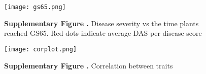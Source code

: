 \documentclass{frontiers_suppmat} %
\begin{document}
\begin{figure}[h!]
\begin{center}
\texttt{[image: gs65.png]}
\end{center}
\textbf{\label{fig:03} Supplementary Figure .}{ Disease severity vs the time plants reached GS65. Red dots indicate average DAS per disease score}
\end{figure}


\begin{figure}[h!]
\begin{center}
\texttt{[image: corplot.png]}
\end{center}
\textbf{\label{fig:04} Supplementary Figure .}{ Correlation between traits}
\end{figure}

%
\end{document}
